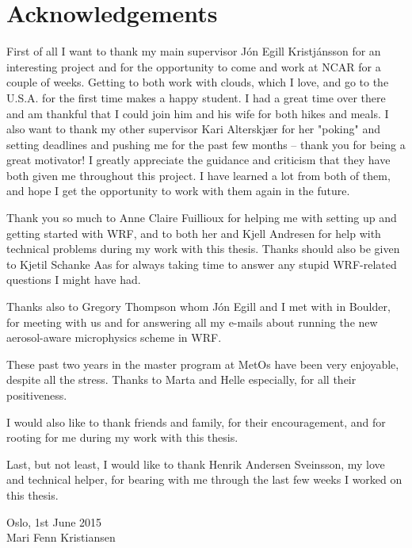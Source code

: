 \chapter*{Acknowledgements}

First of all I want to thank my main supervisor Jón Egill Kristjánsson for an interesting project and for the opportunity to come and work at NCAR for a couple of weeks. Getting to both work with clouds, which I love, and go to the U.S.A. for the first time makes a happy student. I had a great time over there and am thankful that I could join him and his wife for both hikes and meals. I also want to thank my other supervisor Kari Alterskjær for her "poking" and setting deadlines and pushing me for the past few months -- thank you for being a great motivator! I greatly appreciate the guidance and criticism that they have both given me throughout this project. I have learned a lot from both of them, and hope I get the opportunity to work with them again in the future.

Thank you so much to Anne Claire Fuillioux for helping me with setting up and getting started with WRF, and to both her and Kjell Andresen for help with technical problems during my work with this thesis. Thanks should also be given to Kjetil Schanke Aas for always taking time to answer any stupid WRF-related questions I might have had.

Thanks also to Gregory Thompson whom Jón Egill and I met with in Boulder, for meeting with us and for answering all my e-mails about running the new aerosol-aware microphysics scheme in WRF.

These past two years in the master program at MetOs have been very enjoyable, despite all the stress. Thanks to Marta and Helle especially, for all their positiveness.

I would also like to thank friends and family, for their encouragement, and for rooting for me during my work with this thesis.

Last, but not least, I would like to thank Henrik Andersen Sveinsson, my love and technical helper, for bearing with me through the last few weeks I worked on this thesis.

\begin{flushright}
Oslo, 1st June 2015\\Mari Fenn Kristiansen
\end{flushright}
